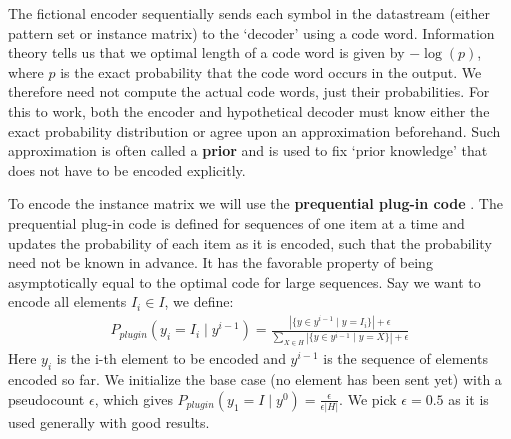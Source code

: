 \documentclass{llncs}
\begin{document}

The fictional encoder sequentially sends each symbol in the datastream (either pattern set or instance matrix) to the `decoder' using a code word. Information theory tells us that we optimal length of a code word is given by $-\log(p)$, where $p$ is the exact probability that the code word occurs in the output. We therefore need not compute the actual code words, just their probabilities. For this to work, both the encoder and hypothetical decoder must know either the exact probability distribution or agree upon an approximation beforehand. Such approximation is often called a \textbf{prior} and is used to fix `prior knowledge' that does not have to be encoded explicitly. 


To encode the instance matrix we will use the \textbf{prequential plug-in code} \cite{ppcode}. The prequential plug-in code is defined for sequences of one item at a time and updates the probability of each item as it is encoded, such that the probability need not be known in advance. It has the favorable property of being asymptotically equal to the optimal code for large sequences. Say we want to encode all elements ${I}_i \in {I}$, we define:
\label{plugin}
\begin{align}
P_{plugin}( y_i = {I}_i \mid y^{i-1} ) = \frac{|\{y \in y^{i-1} \mid y = {I}_i\}| + \epsilon }{\sum_{X \in H}|\{y \in y^{i-1} \mid y = X\}| + \epsilon}
\end{align}
Here $y_i$ is the i-th element to be encoded and $y^{i-1}$ is the sequence of elements encoded so far. We initialize the base case (no element has been sent yet) with a pseudocount $\epsilon$, which gives $P_{plugin}( y_1 = {I} \mid y^{0} ) = \frac{\epsilon}{\epsilon|H|}$. We pick $\epsilon=0.5$ as it is used generally with good results.
\end{document}
